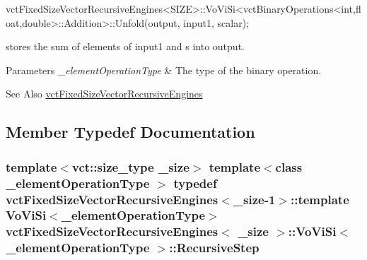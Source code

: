 \begin{DoxyPre}vctFixedSizeVectorRecursiveEngines<SIZE>::VoViSi<vctBinaryOperations<int,float,double>::Addition>::Unfold(output, input1, scalar);
\end{DoxyPre}
 stores the sum of elements of input1 and s into output.


\begin{DoxyParams}{Parameters}
{\em \-\_\-element\-Operation\-Type} & The type of the binary operation.\\
\hline
\end{DoxyParams}
\begin{DoxySeeAlso}{See Also}
\hyperlink{classvct_fixed_size_vector_recursive_engines}{vct\-Fixed\-Size\-Vector\-Recursive\-Engines} 
\end{DoxySeeAlso}


\subsection{Member Typedef Documentation}
\hypertarget{classvct_fixed_size_vector_recursive_engines_1_1_vo_vi_si_accec4105549a16640771c23dad79ac30}{
\subsubsection[{Recursive\-Step}]{\setlength{\rightskip}{0pt plus 5cm}template$<$vct\-::size\-\_\-type \-\_\-size$>$ template$<$class \-\_\-element\-Operation\-Type $>$ typedef {\bf vct\-Fixed\-Size\-Vector\-Recursive\-Engines}$<$\-\_\-size-\/1$>$\-::template {\bf Vo\-Vi\-Si}$<$\-\_\-element\-Operation\-Type$>$ {\bf vct\-Fixed\-Size\-Vector\-Recursive\-Engines}$<$ \-\_\-size $>$\-::{\bf Vo\-Vi\-Si}$<$ \-\_\-element\-Operation\-Type $>$\-::{\bf Recursive\-Step}}}\label{classvct_fixed_size_vector_recursive_engines_1_1_vo_vi_si_accec4105549a16640771c23dad79ac30}


